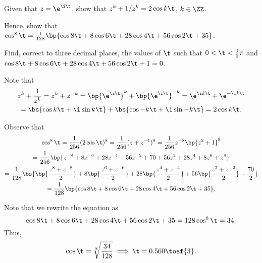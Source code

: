 \begin{problem}
    Given that $z = \e^{\i\t}$, show that $z^k + 1/{z^k} = 2\cos k\t$, $k \in \ZZ$.

    Hence, show that $\cos^8 \t = \frac1{128} \bp{\cos 8\t + 8\cos6\t + 28\cos4\t + 56\cos2\t + 35}$.

    Find, correct to three decimal places, the values of $\t$ such that $0 < \t < \frac12 \pi$ and $\cos 8\t + 8\cos6\t + 28\cos4\t + 56\cos2\t + 1 = 0$.
\end{problem}
\begin{solution}
    Note that
    \begin{gather*}
        z^k + \frac1{z^k} = z^k + z^{-k} = \bp{\e^{\i\t}}^k + \bp{\e^{\i \t}}^{-k} = \e^{\i k \t} + \e^{-\i k \t}\\
        = \bs{\cos{k\t} + \i\sin{k\t}} + \bs{\cos{-k\t} + \i\sin{-k\t}} = 2\cos{k\t}.
    \end{gather*}

    Observe that
    \begin{gather*}
        \cos^8 \t = \frac1{256} (2\cos \t)^8 = \frac1{256} (z + z^{-1})^8 = \frac1{256} z^{-8} \bp{z^2 + 1}^8\\
        = \frac1{256} \bp{z^{-8} + 8z^{-6} + 28z^{-4} + 56z^{-2} + 70 + 56z^2 + 28z^4 + 8z^6 + z^8}\\
        = \frac1{128} \bs{\bp{\frac{z^8 + z^{-8}}2} + 8\bp{\frac{z^6 + z^{-6}}2} + 28\bp{\frac{z^4 + z^{-4}}2} + 56\bp{\frac{z^2 + z^{-2}}2} + \frac{70}2}\\
        = \frac1{128} \bp{\cos 8\t + 8\cos 6\t + 28\cos 4\t + 56\cos 2\t + 35}.
    \end{gather*}

    Note that we rewrite the equation as \[\cos 8\t + 8\cos6\t + 28\cos4\t + 56\cos2\t + 35 = 128\cos^8\t = 34.\] Thus, \[\cos\t = \sqrt[8]{\frac{34}{128}} \implies \t = 0.560 \tosf{3}.\]
\end{solution}